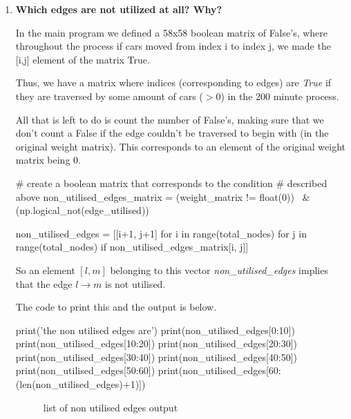 \documentclass[paper=a4, fontsize=12pt]{scrartcl} %
\numberwithin{equation}{section}       %
\numberwithin{figure}{section}         %
\numberwithin{table}{section}          %
\begin{document}
\begin{enumerate}
\item \textbf{Which edges are not utilized at all? Why?}
\leavevmode
\newline

In the main program we defined a 58x58 boolean matrix of False's, where throughout the process if cars moved from index i to index j, we made the [i,j] element of the matrix True.
\leavevmode
\newline

Thus, we have a matrix where indices (corresponding to edges) are \textit{True} if they are traversed by some amount of cars ($ > 0$) in the 200 minute process.
\leavevmode
\newline

All that is left to do is count the number of False's, making sure that we don't count a False if the edge couldn't be traversed to begin with (in the original weight matrix). This corresponds to an element of the original weight matrix being 0.

\begin{python}
# create a boolean matrix that corresponds to the condition
# described above
non_utilised_edges_matrix = (weight_matrix != float(0)) \
                                & (np.logical_not(edge_utilised))
                                
non_utilised_edges = [[i+1, j+1] for i in range(total_nodes)
                          for j in range(total_nodes)
                          if non_utilised_edges_matrix[i, j]]

\end{python}

So an element $[l,m]$ belonging to this vector \textit{non\_utilised\_edges} implies that the edge $l \to m$ is not utilised.

The code to print this and the output is below.

\begin{python}
print('the non utilised edges are')
print(non_utilised_edges[0:10])
print(non_utilised_edges[10:20])
print(non_utilised_edges[20:30])
print(non_utilised_edges[30:40])
print(non_utilised_edges[40:50])
print(non_utilised_edges[50:60])
print(non_utilised_edges[60:(len(non_utilised_edges)+1)])
\end{python}

\begin{figure}[h]
\caption{list of non utilised edges output}
\centering

\end{figure}


\end{enumerate}
\end{document}
